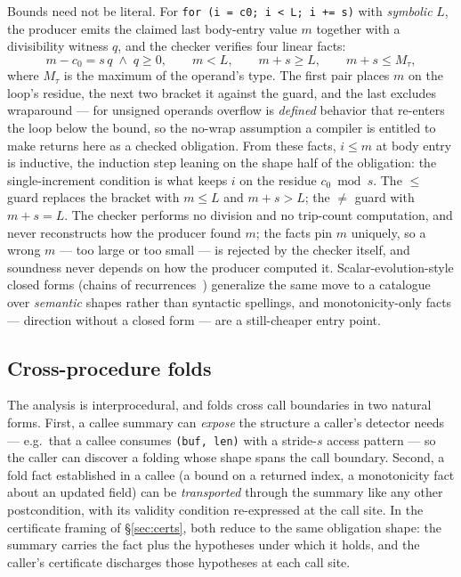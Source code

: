 \documentclass[11pt,a4paper]{article}
\begin{document}
Bounds need not be literal. For \texttt{for (i = c0; i < L; i += s)} with
\emph{symbolic} $L$, the producer emits the claimed last body-entry value $m$ together
with a divisibility witness $q$, and the checker verifies four linear facts:
\[
m - c_0 = s\,q \;\wedge\; q \ge 0, \qquad m < L, \qquad m + s \ge L, \qquad
m + s \le M_\tau,
\]
where $M_\tau$ is the maximum of the operand's type. The first pair places $m$ on the
loop's residue, the next two bracket it against the guard, and the last excludes
wraparound --- for unsigned operands overflow is \emph{defined} behavior that re-enters
the loop below the bound, so the no-wrap assumption a compiler is entitled to make
returns here as a checked obligation. From these facts, $i \le m$ at body entry is
inductive, the induction step leaning on the shape half of the obligation: the
single-increment condition is what keeps $i$ on the residue $c_0 \bmod s$. The $\le$
guard replaces the bracket with $m \le L$ and $m + s > L$; the $\ne$ guard with
$m + s = L$. The checker performs no division and no trip-count computation, and never
reconstructs how the producer found $m$; the facts pin $m$ uniquely, so a wrong $m$ ---
too large or too small --- is rejected by the checker itself, and soundness never depends
on how the producer computed it. Scalar-evolution-style closed forms
(chains of recurrences~\cite{vanengelen2001}) generalize the same move to a catalogue
over \emph{semantic} shapes rather than syntactic spellings, and monotonicity-only facts
--- direction without a closed form --- are a still-cheaper entry point.

\subsection{Cross-procedure folds}
\label{sec:xproc}

The analysis is interprocedural, and folds cross call boundaries in two natural forms.
First, a callee summary can \emph{expose} the structure a caller's detector needs ---
e.g.\ that a callee consumes \texttt{(buf, len)} with a stride-$s$ access pattern --- so
the caller can discover a folding whose shape spans the call boundary. Second, a fold
fact established in a callee (a bound on a returned index, a monotonicity fact about an
updated field) can be \emph{transported} through the summary like any other
postcondition, with its validity condition re-expressed at the call site. In the
certificate framing of \S\ref{sec:certs}, both reduce to the same obligation shape: the
summary carries the fact plus the hypotheses under which it holds, and the caller's
certificate discharges those hypotheses at each call site.
\end{document}
